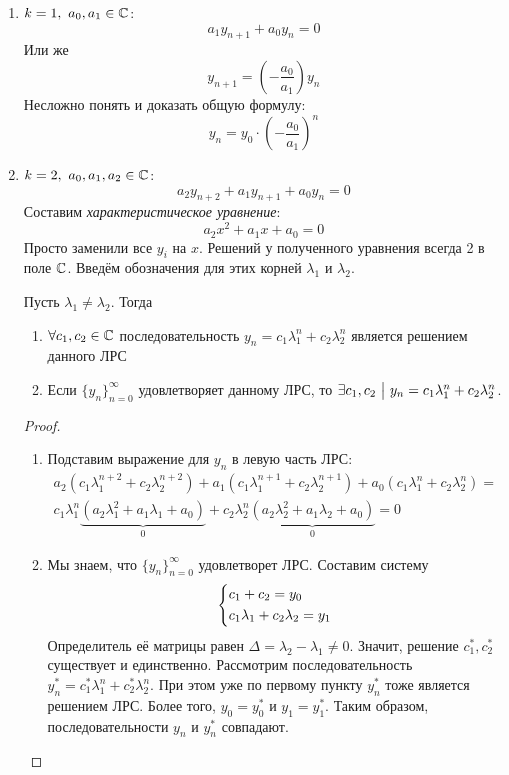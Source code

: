 \begin{enumerate}
	\item $k = 1,\ a_0, a_1 \in \mathbb{C}$:
	\[
		a_1y_{n + 1} + a_0y_n = 0
	\]
	Или же
	\[
		y_{n + 1} = \left(-\frac{a_0}{a_1}\right)y_n
	\]
	Несложно понять и доказать общую формулу:
	\[
		y_{n} = y_0 \cdot \left(-\frac{a_0}{a_1}\right)^n
	\]
	
	\item $k = 2,\ a_0, a_1, a_2 \in \mathbb{C}$:
	\[
		a_2y_{n + 2} + a_1y_{n + 1} + a_0y_n = 0
	\]
	Составим \textit{характеристическое уравнение}:
	\[
		a_2x^2 + a_1x + a_0 = 0
	\]
	Просто заменили все $y_i$ на $x$. Решений у полученного уравнения всегда 2 в поле $\mathbb{C}$. Введём обозначения для этих корней $\lambda_1$ и $\lambda_2$.
	\begin{theorem}
		Пусть $\lambda_1 \neq \lambda_2$. Тогда
		\begin{enumerate}
			\item $\forall c_1, c_2 \in \mathbb{C}$ последовательность $y_n = c_1\lambda_1^n + c_2\lambda_2^n$ является решением данного ЛРС
			\item Если $\{y_n\}_{n = 0}^\infty$ удовлетворяет данному ЛРС, то $\exists c_1, c_2 \ \big|\  y_n = c_1\lambda_1^n + c_2\lambda_2^n$.
		\end{enumerate}
	\end{theorem}

	\begin{proof}~
		\begin{enumerate}
			\item Подставим выражение для $y_n$ в левую часть ЛРС:
			\begin{multline*}
				a_2(c_1\lambda_1^{n + 2} + c_2\lambda_2^{n + 2}) + a_1(c_1\lambda_1^{n + 1} + c_2\lambda_2^{n + 1}) + a_0(c_1\lambda_1^n + c_2\lambda_2^n) =
				\\
				c_1\lambda_1^n\underbrace{(a_2\lambda_1^2 + a_1\lambda_1 + a_0)}_{0} + c_2\lambda_2^n\underbrace{(a_2\lambda_2^2 + a_1\lambda_2 + a_0)}_{0} = 0
			\end{multline*}
			
			\item Мы знаем, что $\{y_n\}_{n = 0}^\infty$ удовлетворет ЛРС. Составим систему
			\[
				\left\{\begin{aligned}
					&{c_1 + c_2 = y_0}
					\\
					&{c_1\lambda_1 + c_2\lambda_2 = y_1}
				\end{aligned}\right.
			\]
			Определитель её матрицы равен $\Delta = \lambda_2 - \lambda_1 \neq 0$. Значит, решение $c_1^*, c_2^*$ существует и единственно. Рассмотрим последовательность $y_n^* = c_1^*\lambda_1^n + c_2^*\lambda_2^n$. При этом уже по первому пункту $y_n^*$ тоже является решением ЛРС. Более того, $y_0 = y_0^*$ и $y_1 = y_1^*$. Таким образом, последовательности $y_n$ и $y_n^*$ совпадают.
		\end{enumerate}
	\end{proof}


\end{enumerate}

